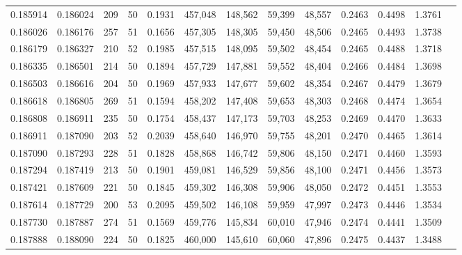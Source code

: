 \begin{tabular}{rrrrrrrrrrrrr}
0.185914 & 0.186024 &   209 &  50 &                                     0.1931 & 457,048 & 148,562 &  59,399 &  48,557 & 0.2463 & 0.4498 & 1.3761 \\
0.186026 & 0.186176 &   257 &  51 &                                     0.1656 & 457,305 & 148,305 &  59,450 &  48,506 & 0.2465 & 0.4493 & 1.3738 \\
0.186179 & 0.186327 &   210 &  52 &                                     0.1985 & 457,515 & 148,095 &  59,502 &  48,454 & 0.2465 & 0.4488 & 1.3718 \\
0.186335 & 0.186501 &   214 &  50 &                                     0.1894 & 457,729 & 147,881 &  59,552 &  48,404 & 0.2466 & 0.4484 & 1.3698 \\
0.186503 & 0.186616 &   204 &  50 &                                     0.1969 & 457,933 & 147,677 &  59,602 &  48,354 & 0.2467 & 0.4479 & 1.3679 \\
0.186618 & 0.186805 &   269 &  51 &                                     0.1594 & 458,202 & 147,408 &  59,653 &  48,303 & 0.2468 & 0.4474 & 1.3654 \\
0.186808 & 0.186911 &   235 &  50 &                                     0.1754 & 458,437 & 147,173 &  59,703 &  48,253 & 0.2469 & 0.4470 & 1.3633 \\
0.186911 & 0.187090 &   203 &  52 &                                     0.2039 & 458,640 & 146,970 &  59,755 &  48,201 & 0.2470 & 0.4465 & 1.3614 \\
0.187090 & 0.187293 &   228 &  51 &                                     0.1828 & 458,868 & 146,742 &  59,806 &  48,150 & 0.2471 & 0.4460 & 1.3593 \\
0.187294 & 0.187419 &   213 &  50 &                                     0.1901 & 459,081 & 146,529 &  59,856 &  48,100 & 0.2471 & 0.4456 & 1.3573 \\
0.187421 & 0.187609 &   221 &  50 &                                     0.1845 & 459,302 & 146,308 &  59,906 &  48,050 & 0.2472 & 0.4451 & 1.3553 \\
0.187614 & 0.187729 &   200 &  53 &                                     0.2095 & 459,502 & 146,108 &  59,959 &  47,997 & 0.2473 & 0.4446 & 1.3534 \\
0.187730 & 0.187887 &   274 &  51 &                                     0.1569 & 459,776 & 145,834 &  60,010 &  47,946 & 0.2474 & 0.4441 & 1.3509 \\
0.187888 & 0.188090 &   224 &  50 &                                     0.1825 & 460,000 & 145,610 &  60,060 &  47,896 & 0.2475 & 0.4437 & 1.3488 \\

\end{tabular}
